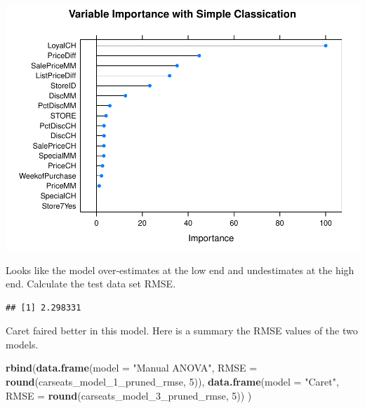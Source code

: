\documentclass[]{book}
\newenvironment{Shaded}{\begin{snugshade}}{\end{snugshade}}
\newcommand{\DataTypeTok}[1]{\textcolor[rgb]{0.13,0.29,0.53}{#1}}
\newcommand{\DecValTok}[1]{\textcolor[rgb]{0.00,0.00,0.81}{#1}}
\newcommand{\KeywordTok}[1]{\textcolor[rgb]{0.13,0.29,0.53}{\textbf{#1}}}
\newcommand{\NormalTok}[1]{#1}
\newcommand{\OperatorTok}[1]{\textcolor[rgb]{0.81,0.36,0.00}{\textbf{#1}}}
\newcommand{\StringTok}[1]{\textcolor[rgb]{0.31,0.60,0.02}{#1}}
\begin{document}
\includegraphics{data-sci_files/figure-latex/unnamed-chunk-77-1.pdf}

Looks like the model over-estimates at the low end and undestimates at the high end. Calculate the test data set RMSE.

\begin{Shaded}
\end{Shaded}

\begin{verbatim}
## [1] 2.298331
\end{verbatim}

Caret faired better in this model. Here is a summary the RMSE values of the two models.

\begin{Shaded}
\begin{Highlighting}[]
\KeywordTok{rbind}\NormalTok{(}\KeywordTok{data.frame}\NormalTok{(}\DataTypeTok{model =} \StringTok{"Manual ANOVA"}\NormalTok{, }
                 \DataTypeTok{RMSE =} \KeywordTok{round}\NormalTok{(carseats_model_}\DecValTok{1}\NormalTok{_pruned_rmse, }\DecValTok{5}\NormalTok{)), }
      \KeywordTok{data.frame}\NormalTok{(}\DataTypeTok{model =} \StringTok{"Caret"}\NormalTok{, }
                 \DataTypeTok{RMSE =} \KeywordTok{round}\NormalTok{(carseats_model_}\DecValTok{3}\NormalTok{_pruned_rmse, }\DecValTok{5}\NormalTok{))}
\NormalTok{)}
\end{Highlighting}
\end{Shaded}
\end{document}
